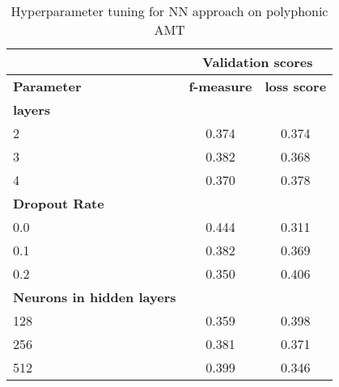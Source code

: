 \begin{table}
    \centering
    \begin{tabular}{|l|c|c|}
        \hline
                                          & \multicolumn{2}{c|}{\textbf{Validation scores}}                                            \\ \hline
        \textbf{Parameter}                & \multicolumn{1}{l|}{\textbf{f-measure}}         & \multicolumn{1}{l|}{\textbf{loss score}} \\ \hline
        \textbf{layers}                   & \multicolumn{1}{l|}{}                           & \multicolumn{1}{l|}{}                    \\ \hline
        2                                 & 0.374                                           & 0.374                                    \\ \hline
        3                                 & 0.382                                           & 0.368                                    \\ \hline
        4                                 & 0.370                                           & 0.378                                    \\ \hline
        \textbf{Dropout Rate}             & \multicolumn{1}{l|}{}                           & \multicolumn{1}{l|}{}                    \\ \hline
        0.0                               & 0.444                                           & 0.311                                    \\ \hline
        0.1                               & 0.382                                           & 0.369                                    \\ \hline
        0.2                               & 0.350                                           & 0.406                                    \\ \hline
        \textbf{Neurons in hidden layers} & \multicolumn{1}{l|}{}                           & \multicolumn{1}{l|}{}                    \\ \hline
        128                               & 0.359                                           & 0.398                                    \\ \hline
        256                               & 0.381                                           & 0.371                                    \\ \hline
        512                               & 0.399                                           & 0.346                                    \\ \hline
    \end{tabular}
    \caption[Hyperparameter gridsearch NN]{Hyperparameter tuning for \ac{NN} approach on polyphonic \ac{AMT}}
    \label{results:table:nn-grid}
\end{table}


